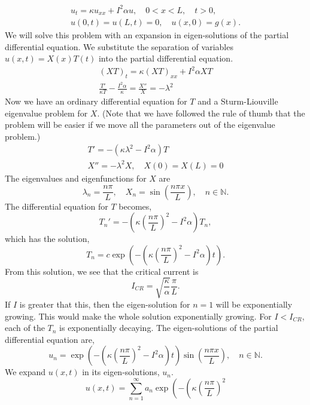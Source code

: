 {%
\begin{Solution}
  \label{solution magnet winding}
  \begin{gather*}
    u_t = \kappa u_{x x} + I^2 \alpha u, \quad 0 < x < L, \quad t > 0, \\
    u(0,t) = u(L,t) = 0, \quad u(x,0) = g(x).
  \end{gather*}
  We will solve this problem with an expansion in eigen-solutions of the partial
  differential equation.  We substitute the separation of variables 
  $u(x,t) = X(x) T(t)$ into the partial differential equation.
  \begin{gather*}
    (X T)_t = \kappa (X T)_{x x} + I^2 \alpha X T \\
    \frac{T'}{\kappa T} - \frac{I^2 \alpha}{\kappa} = \frac{X''}{X} = -\lambda^2
  \end{gather*}
  Now we have an ordinary differential equation for $T$ and a 
  Sturm-Liouville eigenvalue problem for $X$.  (Note that we have followed
  the rule of thumb that the problem will be easier if we move all the
  parameters out of the eigenvalue problem.)
  \begin{gather*}
    T' = - \left( \kappa \lambda^2 - I^2 \alpha \right) T \\
    X'' = - \lambda^2 X, \quad X(0) = X(L) = 0
  \end{gather*}
  The eigenvalues and eigenfunctions for $X$ are
  \[
  \lambda_n = \frac{n \pi}{L}, \quad
  X_n = \sin \left( \frac{n \pi x}{L} \right), \quad
  n \in \mathbb{N}.
  \]
  The differential equation for $T$ becomes,
  \[
  T_n' = - \left( \kappa \left( \frac{n \pi}{L} \right)^2 
    - I^2 \alpha \right) T_n,
  \]
  which has the solution,
  \[
  T_n = c \exp \left( - \left( \kappa \left( \frac{n \pi}{L} \right)^2 
      - I^2 \alpha \right) t \right).
  \]
  From this solution, we see that the critical current is
  \[
  \boxed{
    I_{CR} = \sqrt{ \frac{\kappa}{\alpha} } \frac{\pi}{L}.
    }
  \]
  If $I$ is greater that this, then the eigen-solution for $n = 1$ will be 
  exponentially growing.  This would make the whole solution exponentially
  growing.  For $I < I_{CR}$, each of the $T_n$ is exponentially decaying.  The 
  eigen-solutions of the partial differential equation are,
  \[
  u_n = \exp \left( - \left( \kappa \left( \frac{n \pi}{L} \right)^2 
      - I^2 \alpha \right) t \right)
  \sin \left( \frac{n \pi x}{L} \right), \quad
  n \in \mathbb{N}.
  \]
  We expand $u(x,t)$ in its eigen-solutions, $u_n$.
  \[
  \boxed{
    u(x,t) = \sum_{n=1}^\infty a_n 
    \exp \left( - \left( \kappa \left( \frac{n \pi}{L} \right)^2 
}\]
\end{Solution}}

